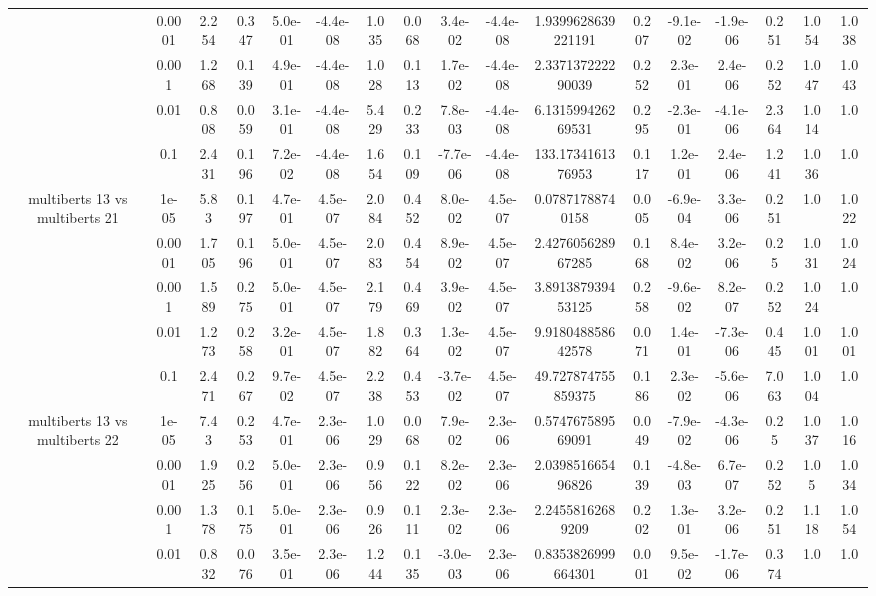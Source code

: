 \begin{tabular}{|c|c|c|c|c|c|c|c|c|c|c|c|c|c|c|c|c|}
 & 0.0001 & 2.254 & 0.347 & 5.0e-01 & -4.4e-08 & 1.035 & 0.068 & 3.4e-02 & -4.4e-08 & 1.9399628639221191 & 0.207 & -9.1e-02 & -1.9e-06 & 0.251 & 1.054 & 1.038 \\
 & 0.001 & 1.268 & 0.139 & 4.9e-01 & -4.4e-08 & 1.028 & 0.113 & 1.7e-02 & -4.4e-08 & 2.337137222290039 & 0.252 & 2.3e-01 & 2.4e-06 & 0.252 & 1.047 & 1.043 \\
 & 0.01 & 0.808 & 0.059 & 3.1e-01 & -4.4e-08 & 5.429 & 0.233 & 7.8e-03 & -4.4e-08 & 6.131599426269531 & 0.295 & -2.3e-01 & -4.1e-06 & 2.364 & 1.014 & 1.0 \\
 & 0.1 & 2.431 & 0.196 & 7.2e-02 & -4.4e-08 & 1.654 & 0.109 & -7.7e-06 & -4.4e-08 & 133.1734161376953 & 0.117 & 1.2e-01 & 2.4e-06 & 1.241 & 1.036 & 1.0 \\
\hline
\multirow{5}{*}{multiberts 13 vs multiberts 21} & 1e-05 & 5.83 & 0.197 & 4.7e-01 & 4.5e-07 & 2.084 & 0.452 & 8.0e-02 & 4.5e-07 & 0.07871788740158 & 0.005 & -6.9e-04 & 3.3e-06 & 0.251 & 1.0 & 1.022 \\
 & 0.0001 & 1.705 & 0.196 & 5.0e-01 & 4.5e-07 & 2.083 & 0.454 & 8.9e-02 & 4.5e-07 & 2.427605628967285 & 0.168 & 8.4e-02 & 3.2e-06 & 0.25 & 1.031 & 1.024 \\
 & 0.001 & 1.589 & 0.275 & 5.0e-01 & 4.5e-07 & 2.179 & 0.469 & 3.9e-02 & 4.5e-07 & 3.891387939453125 & 0.258 & -9.6e-02 & 8.2e-07 & 0.252 & 1.024 & 1.0 \\
 & 0.01 & 1.273 & 0.258 & 3.2e-01 & 4.5e-07 & 1.882 & 0.364 & 1.3e-02 & 4.5e-07 & 9.918048858642578 & 0.071 & 1.4e-01 & -7.3e-06 & 0.445 & 1.001 & 1.001 \\
 & 0.1 & 2.471 & 0.267 & 9.7e-02 & 4.5e-07 & 2.238 & 0.453 & -3.7e-02 & 4.5e-07 & 49.727874755859375 & 0.186 & 2.3e-02 & -5.6e-06 & 7.063 & 1.004 & 1.0 \\
\hline
\multirow{5}{*}{multiberts 13 vs multiberts 22} & 1e-05 & 7.43 & 0.253 & 4.7e-01 & 2.3e-06 & 1.029 & 0.068 & 7.9e-02 & 2.3e-06 & 0.574767589569091 & 0.049 & -7.9e-02 & -4.3e-06 & 0.25 & 1.037 & 1.016 \\
 & 0.0001 & 1.925 & 0.256 & 5.0e-01 & 2.3e-06 & 0.956 & 0.122 & 8.2e-02 & 2.3e-06 & 2.039851665496826 & 0.139 & -4.8e-03 & 6.7e-07 & 0.252 & 1.05 & 1.034 \\
 & 0.001 & 1.378 & 0.175 & 5.0e-01 & 2.3e-06 & 0.926 & 0.111 & 2.3e-02 & 2.3e-06 & 2.24558162689209 & 0.202 & 1.3e-01 & 3.2e-06 & 0.251 & 1.118 & 1.054 \\
 & 0.01 & 0.832 & 0.076 & 3.5e-01 & 2.3e-06 & 1.244 & 0.135 & -3.0e-03 & 2.3e-06 & 0.8353826999664301 & 0.001 & 9.5e-02 & -1.7e-06 & 0.374 & 1.0 & 1.0 \\

\end{tabular}
